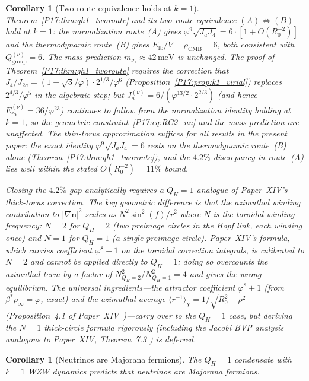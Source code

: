 \documentclass[11pt,a4paper]{article}
\newtheorem{corollary}[theorem]{Corollary}
\theoremstyle{definition}\newtheorem{definition}[theorem]{Definition}
\theoremstyle{remark}
\newcommand{\vp}{\varphi}
\newcommand{\Ja}{J_{2a}}
\newcommand{\Jfour}{J_4}
\newcommand{\rCMB}{\rho_{\mathrm{CMB}}}
\newcommand{\Efb}{E_{\mathrm{fb}}}
\newcommand{\QH}{Q_H}
\begin{document}
\begin{corollary}[Two-route equivalence holds at $k=1$]
\label{P17:cor:two_route_k1}
Theorem~\ref{P17:thm:qh1_tworoute} and its two-route equivalence
$(A)\Leftrightarrow(B)$ hold at $k=1$: the normalization route~(A)
gives $\vp^9\sqrt{J_aJ_4}=6\cdot[1+O(R_0^{-2})]$
and the thermodynamic route~(B) gives $\Efb/V=\rCMB=6$, both
consistent with $Q_{\mathrm{group}}^{(\nu)}=6$.
The mass prediction $m_{\nu_1}\approx42\,\mathrm{meV}$ is unchanged.
The proof of Theorem~\ref{P17:thm:qh1_tworoute} requires the correction
that $\Jfour/\Ja = (1+\sqrt{3}/\vp)\cdot2^{1/3}/\vp^6$
(Proposition~\ref{P17:prop:k1_virial}) replaces $2^{4/3}/\vp^5$
in the algebraic step; but $J_a^{(\nu)}=6/(\vp^{13/2}\cdot2^{2/3})$
(and hence $\Efb^{(\nu)}=36/\vp^{23}$) continues to follow from the
normalization identity holding at $k=1$, so the geometric
constraint~\eqref{P17:eq:RC2_nu} and the mass prediction are unaffected.
The thin-torus approximation suffices for all results in the present
paper: the exact identity $\vp^9\sqrt{J_aJ_4}=6$ rests on the
thermodynamic route~(B) alone (Theorem~\ref{P17:thm:qh1_tworoute}), and
the $4.2\%$ discrepancy in route~(A) lies well within the stated
$O(R_0^{-2})=11\%$ bound.

Closing the $4.2\%$ gap analytically requires a $\QH=1$ analogue of
Paper~XIV's thick-torus correction.  The key geometric difference is
that the azimuthal winding contribution to $|\nabla\mathbf{n}|^2$
scales as $N^2\sin^2(f)/r^2$ where $N$ is the toroidal winding
frequency: $N=2$ for $\QH=2$ (two preimage circles in the Hopf link,
each winding once) and $N=1$ for $\QH=1$ (a single preimage circle).
Paper~XIV's formula, which carries coefficient $\vp^8+1$ on the
toroidal correction integrals, is calibrated to $N=2$ and cannot be
applied directly to $\QH=1$; doing so overcounts the azimuthal term by
a factor of $N_{\QH=2}^2/N_{\QH=1}^2=4$ and gives the wrong
equilibrium.  The universal ingredients---the attractor coefficient
$\vp^8+1$ (from $\beta^*\rho_\infty=\vp$, exact) and the azimuthal
average $\langle r^{-1}\rangle_\chi = 1/\sqrt{R_0^2-\rho^2}$
(Proposition~4.1 %
of Paper~XIV~\cite{Paper14})---carry over to the $\QH=1$ case, but
deriving the $N=1$ thick-circle formula rigorously (including the Jacobi
BVP analysis analogous to Paper~XIV, Theorem~7.3%
) is deferred.
\end{corollary}

\begin{corollary}[Neutrinos are Majorana fermions]
\label{P17:cor:majorana}
The $\QH=1$ condensate with $k=1$ WZW dynamics predicts that
neutrinos are Majorana fermions.
\end{corollary}
\end{document}
